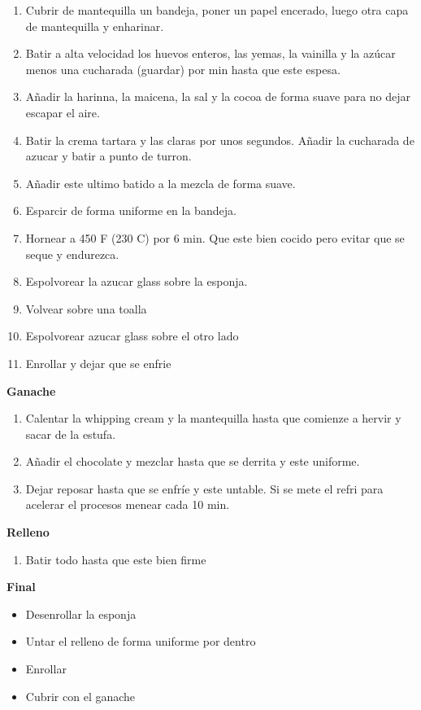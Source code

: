 \begin{enumerate}
\item Cubrir de mantequilla un bandeja, poner un papel encerado, luego otra capa de mantequilla y enharinar.
\item Batir a alta velocidad los huevos enteros, las yemas, la vainilla y la azúcar menos una cucharada (guardar) por  min hasta que este espesa.
\item Añadir la harinna, la maicena, la sal y la cocoa de forma suave para no dejar escapar el aire.
\item Batir la crema tartara y las claras por unos segundos. Añadir la cucharada de azucar y batir a punto de turron.
\item Añadir este ultimo batido a la mezcla de forma suave.
\item Esparcir de forma uniforme en la bandeja.
\item Hornear a 450 F (230 C) por 6 min. Que este bien cocido pero evitar que se seque y endurezca.
\item Espolvorear la azucar glass sobre la esponja.
\item Volvear sobre una toalla
\item Espolvorear azucar glass sobre el otro lado
\item Enrollar y dejar que se enfrie
\end{enumerate}

\textbf{Ganache}

\begin{enumerate}
\item Calentar la whipping cream y la mantequilla hasta que comienze a hervir y sacar de la estufa.
\item Añadir el chocolate y mezclar hasta que se derrita y este uniforme.
\item Dejar reposar hasta que se enfríe y este untable. Si se mete el refri para acelerar el procesos menear cada 10 min.
\end{enumerate}

\textbf{Relleno}
\begin{enumerate}
\item Batir todo hasta que este bien firme
\end{enumerate}

\textbf{Final}
\begin{itemize}
\item Desenrollar la esponja
\item Untar el relleno de forma uniforme por dentro
\item Enrollar
\item Cubrir con el ganache
\end{itemize}

